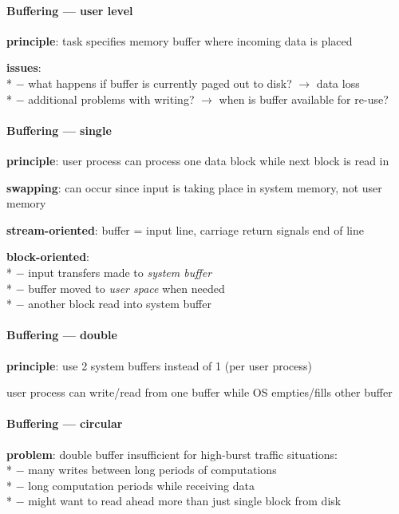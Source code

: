 \paragraph{Buffering --- user level}
\begin{items}
  \item \textbf{principle}: task specifies memory buffer where incoming data is placed
  \item \textbf{issues}: \\*
    $ - $ what happens if buffer is currently paged out to disk? $ \to $ data loss \\*
    $ - $ additional problems with writing? $ \to $ when is buffer available for re-use?
\end{items}

\paragraph{Buffering --- single}
\begin{items}
  \item \textbf{principle}: user process can process one data block while next block is read in
  \item \textbf{swapping}: can occur since input is taking place in system memory, not user memory
  \item \textbf{stream-oriented}: buffer = input line, carriage return signals end of line
  \item \textbf{block-oriented}: \\*
    $ - $ input transfers made to \emph{system buffer} \\*
    $ - $ buffer moved to \emph{user space} when needed \\*
    $ - $ another block read into system buffer
\end{items}

\paragraph{Buffering --- double}
\begin{items}
  \item \textbf{principle}: use 2 system buffers instead of 1 (per user process)
  \item user process can write/read from one buffer while OS empties/fills other buffer
\end{items}

\paragraph{Buffering --- circular}
\begin{items}
  \item \textbf{problem}: double buffer insufficient for high-burst traffic situations: \\*
    $ - $ many writes between long periods of computations \\*
    $ - $ long computation periods while receiving data \\*
    $ - $ might want to read ahead more than just single block from disk
\end{items}